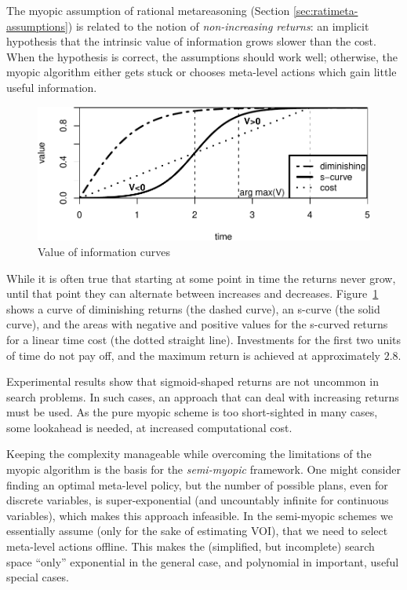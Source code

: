 The myopic assumption of rational metareasoning
(Section \ref{sec:ratimeta-assumptions}) is related to the notion of {\it non-increasing returns}: an implicit hypothesis that the intrinsic
value of information grows slower than the cost. When the hypothesis is correct,
the assumptions should work well; otherwise, the myopic algorithm either
gets stuck or chooses meta-level actions which gain little useful information.

\begin{figure}[h]
\centering
\includegraphics[scale=0.65]{s-curve.pdf}
\caption{Value of information curves} 
\label{fig:greedy-s-curve}
\end{figure} 

While it is often true that starting at
some point in time the returns never grow, until that point they can
alternate between increases and decreases. Figure~\ref{fig:greedy-s-curve}
shows a curve of diminishing returns (the
dashed curve), an s-curve (the solid curve), and the areas with
negative and positive values for the s-curved returns for a linear
time cost (the dotted straight line). Investments for the first two units
of time do not pay off, and the maximum return is achieved at
approximately $2.8$.

Experimental results show \cite{Zilberstein.sensing} that
sigmoid-shaped returns are not uncommon 
in search problems.  In such cases, an approach that can deal
with increasing returns must be used.
As the pure myopic scheme is too short-sighted in many cases,
some lookahead is needed, at increased computational cost.

Keeping the complexity manageable while overcoming the limitations of
the myopic algorithm is the basis for the \emph{semi-myopic} framework.
One might consider finding an optimal meta-level policy, but the
number of possible plans, even for discrete variables, is
super-exponential (and uncountably infinite for continuous variables),
which makes this approach infeasible.  In the semi-myopic schemes we
essentially assume (only for the sake of estimating VOI), that we need
to select meta-level actions offline. This makes the (simplified, but
incomplete) search space ``only'' exponential in the general case, and
polynomial in important, useful special cases.

